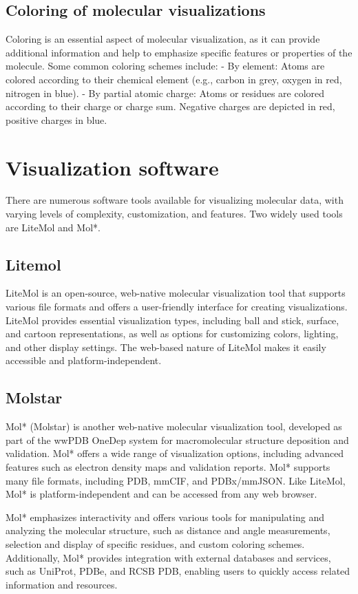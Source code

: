 \documentclass[
  digital,     %
  oneside,     %
  nosansbold,  %
  nocolorbold, %
  lof,         %
  lot,         %
]{fithesis4}
\begin{document}
\subsection{Coloring of molecular visualizations}
Coloring is an essential aspect of molecular visualization, as it can provide additional information and help to emphasize specific features or properties of the molecule. Some common coloring schemes include:
- By element: Atoms are colored according to their chemical element (e.g., carbon in grey, oxygen in red, nitrogen in blue).
- By partial atomic charge: Atoms or residues are colored according to their charge or charge sum. Negative charges are depicted in red, positive charges in blue.

\section{Visualization software}
There are numerous software tools available for visualizing molecular data, with varying levels of complexity, customization, and features. Two widely used tools are LiteMol and Mol*.

\subsection{Litemol}
LiteMol is an open-source, web-native molecular visualization tool that supports various file formats and offers a user-friendly interface for creating visualizations. LiteMol provides essential visualization types, including ball and stick, surface, and cartoon representations, as well as options for customizing colors, lighting, and other display settings. The web-based nature of LiteMol makes it easily accessible and platform-independent.

\subsection{Molstar}
Mol* (Molstar) is another web-native molecular visualization tool, developed as part of the wwPDB OneDep system for macromolecular structure deposition and validation. Mol* offers a wide range of visualization options, including advanced features such as electron density maps and validation reports. Mol* supports many file formats, including PDB, mmCIF, and PDBx/mmJSON. Like LiteMol, Mol* is platform-independent and can be accessed from any web browser.

Mol* emphasizes interactivity and offers various tools for manipulating and analyzing the molecular structure, such as distance and angle measurements, selection and display of specific residues, and custom coloring schemes. Additionally, Mol* provides integration with external databases and services, such as UniProt, PDBe, and RCSB PDB, enabling users to quickly access related information and resources.
\end{document}

